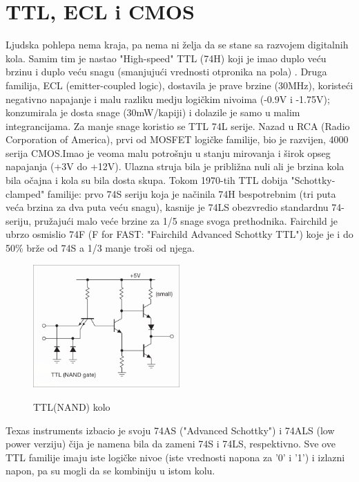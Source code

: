 \documentclass[12pt,a4paper]{article}
\begin{document}
\newpage

\noindent\makebox[\linewidth]{\rule{0.8\paperwidth}{.4pt}}
\section{TTL, ECL i CMOS}
Ljudska pohlepa nema kraja, pa nema ni želja da se stane sa razvojem digitalnih kola.\newline
Samim tim je nastao "High-speed" TTL (74H) koji je imao duplo veću brzinu i duplo veću snagu (smanjujući vrednosti otpronika na pola) .\cite{art}
Druga familija, ECL (emitter-coupled logic), dostavila je prave brzine (30MHz), koristeći negativno napajanje i malu razliku medju logičkim nivoima (-0.9V i -1.75V); konzumirala je dosta snage (30mW/kapiji) i dolazile je samo u malim integrancijama.
Za manje snage koristio se TTL 74L serije. 
Nazad u RCA (Radio Corporation of America), prvi od MOSFET logičke familije, bio je razvijen, 4000 serija CMOS.Imao je veoma malu potrošnju u stanju mirovanja i širok opseg napajanja (+3V do +12V). Ulazna struja bila je približna nuli ali je brzina kola bila očajna i kola su bila dosta skupa.
Tokom 1970-tih TTL dobija "Schottky-clamped" familije: prvo 74S seriju koja je načinila 74H bespotrebnim (tri puta veća brzina za dva puta veću snagu), kasnije je 74LS obezvredio standardnu 74-seriju, pružajući malo veće brzine za 1/5 snage svoga prethodnika. 
Fairchild je ubrzo osmislio 74F (F for FAST: "Fairchild Advanced Schottky TTL") koje je i do 50\% brže od 74S a 1/3 manje troši od njega.
\begin{figure}[ht]
  \centering
  \includegraphics[width=0.5\textwidth]{TTL(NAND).png}
  \caption{TTL(NAND) kolo}\cite{art}
\end{figure}
\newline
Texas instruments izbacio je svoju 74AS ("Advanced Schottky") i 74ALS (low power verziju) čija je namena bila da zameni 74S i 74LS, respektivno. 
Sve ove TTL familije imaju iste logičke nivoe (iste vrednosti napona za '0' i '1') i izlazni napon, pa su mogli da se kombiniju u istom kolu.\cite{art}
\end{document}
